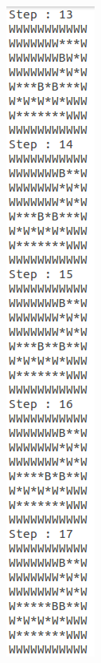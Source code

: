 \documentclass[10pt, letter]{article}
\begin{document}
\begin{figure} [h!]
\begin{subfigure}{.3\textwidth}
  \includegraphics[scale = 0.35]{images/sokoban3-ans4}
\end{subfigure}%
\begin{subfigure}{.3\textwidth}
  \centering

\end{subfigure}
\end{figure}
\end{document}
